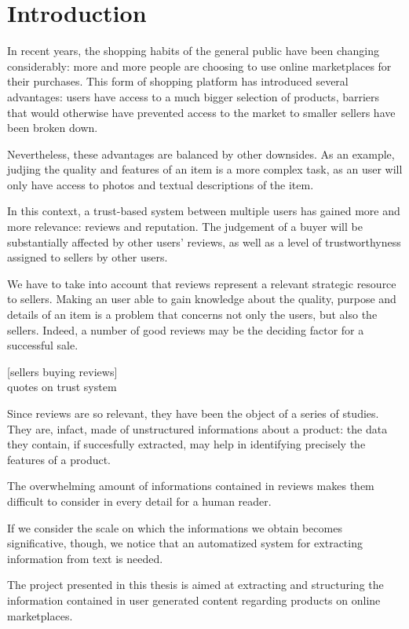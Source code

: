 \documentclass[LaM,binding=0.6cm]{sapthesis}
\begin{document}
\tableofcontents

\mainmatter

\chapter{Introduction}
 In recent years, the shopping habits of the general public have been changing considerably: more and more people are choosing to use online marketplaces for their purchases. This form of shopping platform has introduced several advantages: users have access to a much bigger selection of products, barriers that would otherwise have prevented access to the market to smaller sellers have been broken down.

 Nevertheless, these advantages are balanced by other downsides. As an example, judjing the quality and features of an item is a more complex task, as an user will only have access to photos and textual descriptions of the item.

 In this context, a trust-based system between multiple users has gained more and more relevance: reviews and reputation. The judgement of a buyer will be substantially affected by other users' reviews, as well as a level of trustworthyness assigned to sellers by other users.

 We have to take into account that reviews represent a relevant strategic resource to sellers.
 Making an user able to gain knowledge about the quality, purpose and details of an item is a problem that concerns not only the users, but also the sellers. Indeed, a number of good reviews may be the deciding factor for a successful sale. 

 [sellers buying reviews] \\
 quotes on trust system

 \bigskip

 Since reviews are so relevant, they have been the object of a series of studies. They are, infact, made of unstructured informations about a product: the data they contain, if succesfully extracted, may help in identifying precisely the features of a product. 

 The overwhelming amount of informations contained in reviews makes them difficult to consider in every detail for a human reader. 

 If we consider the scale on which the informations we obtain becomes significative, though, we notice that an automatized system for extracting information from text is needed. 

 The project presented in this thesis is aimed at extracting and structuring the information contained in user generated content regarding products on online marketplaces. 
\end{document}
